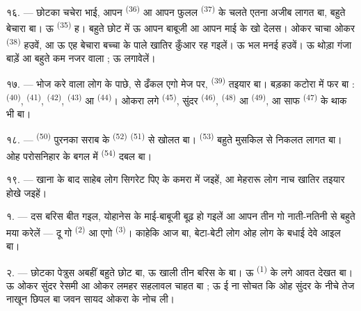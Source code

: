 १६. --- छोटका चचेरा भाई, आपन  \textsuperscript{(36)} आ आपन
फुलल  \textsuperscript{(37)} के चलते एतना अजीब लागत बा,
बहुते बेचारा बा। ऊ  \textsuperscript{(35)} ह। बहुते छोट में
ऊ आपन बाबूजी आ आपन माई के खो देलस। ओकर चाचा ओकर 
\textsuperscript{(38)} हउवें, आ ऊ एह बेचारा बच्चा के पाले खातिर कुँआर
रह गइलें। ऊ भल मनई हउवें। ऊ थोड़ा गंजा बाड़ें आ बहुते कम नजर वाला ;
ऊ  लगावेलें।

\VUsaut{2.4mm}
\VUsaut{3.0mm}

१७. --- भोज करे वाला लोग के पाछे,  से ढँकल एगो मेज पर,
 \textsuperscript{(39)} तइयार बा। बड़का कटोरा में फर
बा :  \textsuperscript{(40)}, 
\textsuperscript{(41)},  \textsuperscript{(42)},
 \textsuperscript{(43)} आ  \textsuperscript{(44)}।
ओकरा लगे  \textsuperscript{(45)}, सुंदर 
\textsuperscript{(46)},  \textsuperscript{(48)} आ
 \textsuperscript{(49)}, आ साफ 
\textsuperscript{(47)} के थाक भी बा।

१८. ---  \textsuperscript{(50)} पुरनका सराब के
 \textsuperscript{(52)}  \textsuperscript{(51)}
से खोलत बा।  \textsuperscript{(53)} बहुते मुसकिल से
निकलत लागत बा। ओह परोसनिहार के बगल में 
\textsuperscript{(54)} दबल बा।

१९. --- खाना के बाद साहेब लोग सिगरेट पिए के कमरा में जइहें, आ मेहरारू
लोग नाच खातिर तइयार होखे जइहें।

\VUsaut{5.0mm}
\VUsaut{1.6mm}
\VUsaut{2.6mm}

\VUsaut{3.0mm}

१. --- दस बरिस बीत गइल, योहानेस के माई-बाबूजी बूढ़ हो गइलें आ आपन तीन
गो नाती-नतिनी से बहुते मया करेलें — दू गो 
\textsuperscript{(2)} आ एगो  \textsuperscript{(3)}।
काहेकि आज  बा, बेटा-बेटी लोग ओह लोग के
बधाई देवे आइल बा।

२. --- छोटका पेत्रुस अबहीं बहुते छोट बा, ऊ खाली तीन बरिस के बा। ऊ
 \textsuperscript{(1)} के लगे आवत देखत बा। ऊ ओकर सुंदर
रेसमी  आ ओकर लमहर  सहलावल चाहत बा ; ऊ ई ना
सोचत कि ओह सुंदर  के नीचे तेज नाखून छिपल बा जवन सायद ओकरा
के नोच ली।

